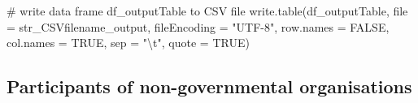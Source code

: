 \documentclass[
]{article}
\newenvironment{Shaded}{\begin{snugshade}}{\end{snugshade}}
\newcommand{\AttributeTok}[1]{\textcolor[rgb]{0.00,0.34,0.68}{#1}}
\newcommand{\CommentTok}[1]{\textcolor[rgb]{0.54,0.53,0.53}{#1}}
\newcommand{\ConstantTok}[1]{\textcolor[rgb]{0.67,0.33,0.00}{#1}}
\newcommand{\FunctionTok}[1]{\textcolor[rgb]{0.39,0.29,0.61}{#1}}
\newcommand{\NormalTok}[1]{\textcolor[rgb]{0.12,0.11,0.11}{#1}}
\newcommand{\SpecialCharTok}[1]{\textcolor[rgb]{0.24,0.68,0.91}{#1}}
\newcommand{\StringTok}[1]{\textcolor[rgb]{0.75,0.01,0.01}{#1}}
\begin{document}
\begin{Shaded}
\begin{Highlighting}[]
\CommentTok{\# write data frame \textquotesingle{}df\_outputTable\textquotesingle{} to CSV file}
\FunctionTok{write.table}\NormalTok{(df\_outputTable, }\AttributeTok{file =}\NormalTok{ str\_CSVfilename\_output,}
            \AttributeTok{fileEncoding =} \StringTok{"UTF{-}8"}\NormalTok{, }\AttributeTok{row.names =} \ConstantTok{FALSE}\NormalTok{,}
            \AttributeTok{col.names =} \ConstantTok{TRUE}\NormalTok{, }\AttributeTok{sep =} \StringTok{"}\SpecialCharTok{\textbackslash{}t}\StringTok{"}\NormalTok{, }\AttributeTok{quote =} \ConstantTok{TRUE}\NormalTok{)}
\end{Highlighting}
\end{Shaded}

\hypertarget{participants-of-non-governmental-organisations}{%
\subsection{Participants of non-governmental
organisations}\label{participants-of-non-governmental-organisations}}
\end{document}
